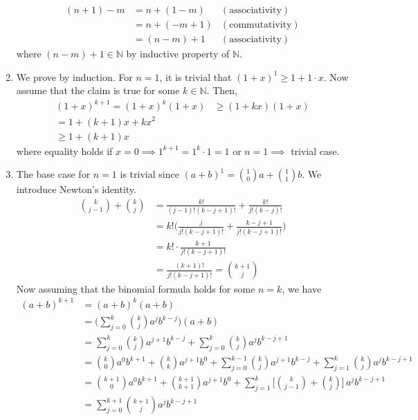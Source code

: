 \begin{solution}
\begin{enumerate}
      \begin{align*}
        (n + 1) - m & = n + (1 - m ) & (\text{associativity}) \\
        & = n + (-m + 1) & (\text{commutativity}) \\
        & = (n - m) + 1 & (\text{associativity})
      \end{align*}
      where $(n - m) + 1 \in \mathbb{N}$ by inductive property of $\mathbb{N}$. 
      \item We prove by induction. For $n=1$, it is trivial that $(1 + x)^1 \geq 1 + 1 \cdot x$. Now assume that the claim is true for some $k \in \mathbb{N}$. Then, 
      \begin{align*}
        (1 + x)^{k+1} = (1 + x)^k (1 + x) & \geq (1 + k x) (1 + x) \\
        = 1 + (k+1) x + k x^2 \\ 
        \geq 1 + (k+1) x
      \end{align*}
      where equality holds if $x = 0 \implies 1^{k+1} = 1^k \cdot 1 = 1$ or $n=1 \implies $ trivial case. 
      \item The base case for $n=1$ is trivial since $(a + b)^1 = \binom{1}{0} a + \binom{1}{1} b$. We introduce Newton's identity. 
      \begin{align*}
        \binom{k}{j-1} + \binom{k}{j} & = \frac{k!}{(j-1)! (k-j+1)!} + \frac{k!}{j! (k-j)!} \\
        & = k! \bigg( \frac{j}{j! (k-j+1)!} + \frac{k-j+1}{j! (k-j+1)!} \bigg) \\
        & = k! \cdot \frac{k+1}{j! (k-j+1)!} \\
        & = \frac{(k+1)!}{j!(k-j+1)!} = \binom{k+1}{j}
      \end{align*}
      Now assuming that the binomial formula holds for some $n=k$, we have 
      \begin{align}
        (a + b)^{k+1} & = (a + b)^k (a + b) \\
        & = \bigg( \sum_{j=0}^k \binom{k}{j} a^j b^{k-j} \bigg) (a + b) \\
        & = \sum_{j=0}^k \binom{k}{j} a^{j+1} b^{k-j} + \sum_{j=0}^k \binom{k}{j} a^j b^{k-j + 1} \\
        & = \binom{k}{0} a^0 b^{k+1} + \binom{k}{k} a^{j+1} b^0 + \sum_{j=0}^{k-1} \binom{k}{j} a^{j+1} b^{k-j} + \sum_{j=1}^k \binom{k}{j} a^j b^{k-j+1} \\
        & = \binom{k+1}{0} a^0 b^{k+1} + \binom{k+1}{k+1} a^{j+1} b^0 + \sum_{j=1}^k \bigg[ \binom{k}{j-1} + \binom{k}{j} \bigg] \, a^j b^{k-j + 1} \\
        & = \sum_{j=0}^{k+1} \binom{k+1}{j} a^j b^{k-j+1} 
      \end{align}
    \end{enumerate}
  \end{solution}

